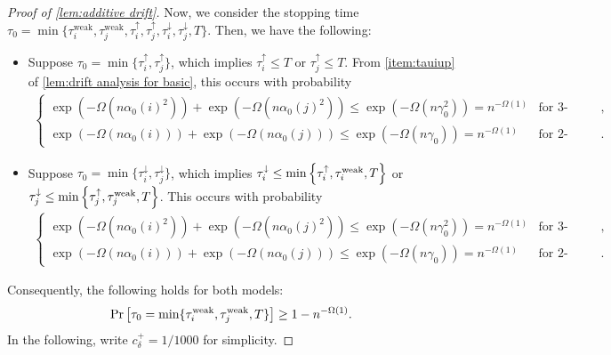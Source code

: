 \documentclass[letterpaper,11pt]{article}
\newcommand{\alphanorm}{\gamma}
\newcommand{\cdeltaplus}{c^{+}_\delta}
\newcommand{\taudeltadown}{\tau^{\downarrow}_\delta}
\newcommand{\tauiup}{\tau^{\uparrow}_i}
\newcommand{\tauidown}{\tau^{\downarrow}_i}
\newcommand{\tauiweak}{\tau^{\mathrm{weak}}_i}
\newcommand{\taujweak}{\tau^{\mathrm{weak}}_j}
\newcommand{\taujup}{\tau^{\uparrow}_j}
\newcommand{\taujdown}{\tau^{\downarrow}_j}
\begin{document}
\begin{proof}[Proof of \cref{lem:additive drift}]
  Now, we consider the stopping time $\tau_0=\min\{\tauiweak,\taujweak,\tauiup,\taujup,\tauidown,\taujdown,T\}$.
  Then, we have the following:
  \begin{itemize}
    \item Suppose $ \tau_0 = \min\{\tauiup,\taujup\}$, which implies $ \tauiup \le T$ or $ \taujup \le T $. 
    From \cref{item:tauiup} of \cref{lem:drift analysis for basic}, this occurs with probability
          \begin{align*}
          \begin{cases}
              \exp(-\Omega(n\alpha_0(i)^2))+\exp(-\Omega(n\alpha_0(j)^2))\leq \exp(-\Omega(n\alphanorm_0^2))=n^{-\Omega(1)} & \text{for 3-Majority},\\
              \exp(-\Omega(n\alpha_0(i)))+\exp(-\Omega(n\alpha_0(j)))\leq \exp(-\Omega(n\alphanorm_0))=n^{-\Omega(1)} & \text{for 2-Choices}.
          \end{cases}
      \end{align*}
    \item Suppose $ \tau_0 = \min\{\tauidown,\taujdown\}$, which implies $ \tauidown\le \min\qty{\tauiup, \tauiweak, T }$ or $ \taujdown\le \min\qty{\taujup, \taujweak, T }$.
      This occurs with probability
      \begin{align*}
          \begin{cases}
              \exp(-\Omega(n\alpha_0(i)^2))+\exp(-\Omega(n\alpha_0(j)^2))\leq \exp(-\Omega(n\alphanorm_0^2))=n^{-\Omega(1)} & \text{for 3-Majority},\\
              \exp(-\Omega(n\alpha_0(i)))+\exp(-\Omega(n\alpha_0(j)))\leq \exp(-\Omega(n\alphanorm_0))=n^{-\Omega(1)} & \text{for 2-Choices}.
          \end{cases}
      \end{align*}
    \end{itemize}
    Consequently, the following holds for both models:
    \begin{align}
      \Pr\qty[\tau_0=\min\{\tauiweak,\taujweak,T\}]\geq 1- n^{-\Omega(1)}.
      \label{eq:add tauijupdown}
    \end{align}
    In the following, write $\cdeltaplus=1/1000$ for simplicity.


\end{proof}
\end{document}
